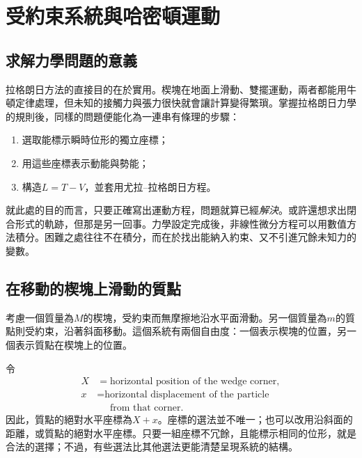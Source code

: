\chapter{受約束系統與哈密頓運動}


\section{求解力學問題的意義}

拉格朗日方法的直接目的在於實用。楔塊在地面上滑動、雙擺運動，兩者都能用牛頓定律處理，但未知的接觸力與張力很快就會讓計算變得繁瑣。掌握拉格朗日力學的規則後，同樣的問題便能化為一連串有條理的步驟：
\begin{enumerate}
  \item 選取能標示瞬時位形的獨立座標；
  \item 用這些座標表示動能與勢能；
  \item 構造\(L=T-V\)，並套用尤拉--拉格朗日方程。
\end{enumerate}

就此處的目的而言，只要正確寫出運動方程，問題就算已經\emph{解決}。或許還想求出閉合形式的軌跡，但那是另一回事。力學設定完成後，非線性微分方程可以用數值方法積分。困難之處往往不在積分，而在於找出能納入約束、又不引進冗餘未知力的變數。

\section{在移動的楔塊上滑動的質點}

考慮一個質量為\(M\)的楔塊，受約束而無摩擦地沿水平面滑動。另一個質量為\(m\)的質點則受約束，沿著斜面移動。這個系統有兩個自由度：一個表示楔塊的位置，另一個表示質點在楔塊上的位置。

令
\begin{equation}
  \begin{aligned}
    X&=\text{horizontal position of the wedge corner},\\
    x&=\text{horizontal displacement of the particle}\\[-0.2em]
     &\phantom{={}}\text{from that corner}.
  \end{aligned}
  \label{eq:l6-wedge-coordinates}
\end{equation}
因此，質點的絕對水平座標為\(X+x\)。座標的選法並不唯一；也可以改用沿斜面的距離，或質點的絕對水平座標。只要一組座標不冗餘，且能標示相同的位形，就是合法的選擇；不過，有些選法比其他選法更能清楚呈現系統的結構。

